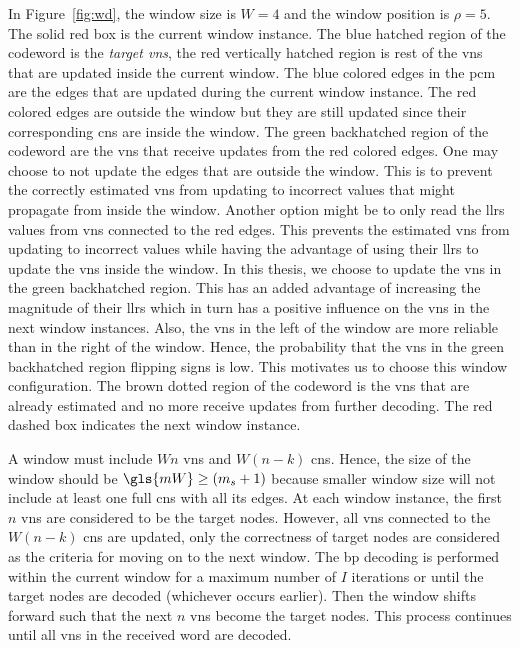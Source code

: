 In Figure~\ref{fig:wd}, the window size is $W=4$ and the window position is $\rho=5$. The solid red box is the current window instance. The blue hatched region of the codeword is the \emph{target \glspl{vn}}, the red vertically hatched region is rest of the \glspl{vn} that are updated inside the current window. The blue colored edges in the \gls{pcm} are the edges that are updated during the current window instance. The red colored edges are outside the window but they are still updated since their corresponding \glspl{cn} are inside the window. The green backhatched region of the codeword are the \glspl{vn} that receive updates from the red colored edges. One may choose to not update the edges that are outside the window. This is to prevent the correctly estimated \glspl{vn} from updating to incorrect values that might propagate from inside the window. Another option might be to only read the \glspl{llr} values from \glspl{vn} connected to the red edges. This prevents the estimated \glspl{vn} from updating to incorrect values while having the advantage of using their \glspl{llr} to update the \glspl{vn} inside the window. In this thesis, we choose to update the \glspl{vn} in the green backhatched region. This has an added advantage of increasing the magnitude of their \glspl{llr} which in turn has a positive influence on the \glspl{vn} in the next window instances. Also, the \glspl{vn} in the left of the window are more reliable than in the right of the window. Hence, the probability that the \glspl{vn} in the green backhatched region flipping signs is low. This motivates us to choose this window configuration. The brown dotted region of the codeword is the \glspl{vn} that are already estimated and no more receive updates from further decoding. The red dashed box indicates the next window instance. 

A window must include $Wn$ \glspl{vn} and $W(n-k)$ \glspl{cn}. Hence, the size of the window should be $\gls{mW}\geq (m_s+1)$ because smaller window size will not include at least one full \glspl{cn} with all its edges. At each window instance, the first $n$ \glspl{vn} are considered to be the target nodes. However, all \glspl{vn} connected to the $W(n-k)$ \glspl{cn} are updated, only the correctness of target nodes are considered as the criteria for moving on to the next window. The \gls{bp} decoding is performed within the current window for a maximum number of $I$ iterations or until the target nodes are decoded (whichever occurs earlier). Then the window shifts forward such that the next $n$ \glspl{vn} become the target nodes. This process continues until all \glspl{vn} in the received word are decoded.

